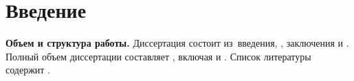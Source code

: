 \chapter*{Введение}                         %

\newcommand{\actuality}{}
\newcommand{\progress}{}
\newcommand{\aim}{\textbf{\aimTXT}}
\newcommand{\tasks}{\textbf{\tasksTXT}}
\newcommand{\novelty}{\textbf{\noveltyTXT}}
\newcommand{\influencetheor}{\textbf{\influencetheorTXT}}
\newcommand{\influence}{\textbf{\influenceTXT}}
\newcommand{\methods}{\textbf{\methodsTXT}}
\newcommand{\defpositions}{\textbf{\defpositionsTXT}}
\newcommand{\reliability}{\textbf{\reliabilityTXT}}
\newcommand{\probation}{\textbf{\probationTXT}}
\newcommand{\contribution}{\textbf{\contributionTXT}}
\newcommand{\publications}{\textbf{\publicationsTXT}}
\newcommand{\realize}{\textbf{\realizeTXT}}
\newcommand{\object}{\textbf{\objectTXT}}
\newcommand{\subject}{\textbf{\subjectTXT}}
\newcommand{\hypothesis}{\textbf{\hypothesisTXT}}
\newcommand{\scope}{\textbf{\scopeTXT}}


\textbf{Объем и структура работы.} Диссертация состоит из~введения,
,
заключения и
.
%
Полный объем диссертации составляет
, включая
 и
.
Список литературы содержит
.
